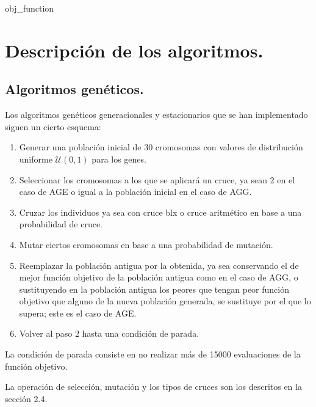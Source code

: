 \documentclass[11pt,a4paper]{article}
\theoremstyle{definition}
\begin{document}
	\begin{algorithm}[H]
		\caption{obj\_function}
	\end{algorithm}
	
	\section{Descripción de los algoritmos.}
	\subsection{Algoritmos genéticos.}
	Los algoritmos genéticos generacionales y estacionarios que se han implementado siguen un cierto esquema:
	\begin{enumerate}
		\item Generar una población inicial de 30 cromosomas con valores de distribución uniforme $\mathcal{U}(0,1)$ para los genes.
		\item Seleccionar los cromosomas a los que se aplicará un cruce, ya sean 2 en el caso de AGE o igual a la población inicial en el caso de AGG.
		\item Cruzar los individuos ya sea con cruce blx o cruce aritmético en base a una probabilidad de cruce.
		\item Mutar ciertos cromosomas en base a una probabilidad de mutación.
		\item Reemplazar la población antigua por la obtenida, ya sea conservando el de mejor función objetivo de la población antigua como en el caso de AGG, o sustituyendo en la población antigua los peores que tengan peor función objetivo que alguno de la nueva población generada, se sustituye por el que lo supera; este es el caso de AGE.%
		\item Volver al paso 2 hasta una condición de parada.
	\end{enumerate}
	
	La condición de parada consiste en no realizar más de 15000 evaluaciones de la función objetivo.
	
	La operación de selección, mutación y los tipos de cruces son los descritos en la sección 2.4.~\\
	
\end{document}
